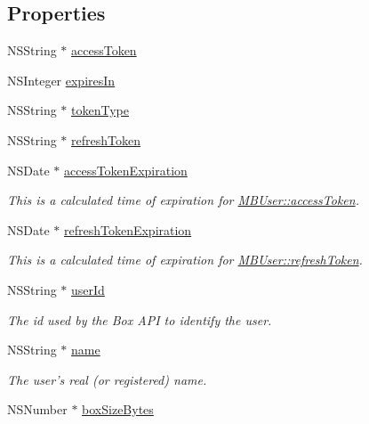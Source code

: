 \subsection*{Properties}
\begin{DoxyCompactItemize}
\item 
N\-S\-String $\ast$ \hyperlink{interface_m_b_user_aae7d6df5c0e6da13e80b3ddb82ae7081}{access\-Token}
\item 
N\-S\-Integer \hyperlink{interface_m_b_user_ae251d07feaa95423629811e829c40f0a}{expires\-In}
\item 
N\-S\-String $\ast$ \hyperlink{interface_m_b_user_aebb1b1ab373299d1bbcb8edacfc117c2}{token\-Type}
\item 
N\-S\-String $\ast$ \hyperlink{interface_m_b_user_a52a523200e9ed6203d66dc7250c725dd}{refresh\-Token}
\item 
N\-S\-Date $\ast$ \hyperlink{interface_m_b_user_a66df6e37883628503b521d292bbe692b}{access\-Token\-Expiration}
\begin{DoxyCompactList}\small\item\em This is a calculated time of expiration for \hyperlink{interface_m_b_user_aae7d6df5c0e6da13e80b3ddb82ae7081}{M\-B\-User\-::access\-Token}. \end{DoxyCompactList}\item 
N\-S\-Date $\ast$ \hyperlink{interface_m_b_user_a73ea1a88a0ebe4f2fe0e71809784ebfd}{refresh\-Token\-Expiration}
\begin{DoxyCompactList}\small\item\em This is a calculated time of expiration for \hyperlink{interface_m_b_user_a52a523200e9ed6203d66dc7250c725dd}{M\-B\-User\-::refresh\-Token}. \end{DoxyCompactList}\item 
N\-S\-String $\ast$ \hyperlink{interface_m_b_user_a25211835b4b5dff492e975e6231df626}{user\-Id}
\begin{DoxyCompactList}\small\item\em The id used by the Box A\-P\-I to identify the user. \end{DoxyCompactList}\item 
N\-S\-String $\ast$ \hyperlink{interface_m_b_user_a4b93d352d2fca75b34e1b5a50e03f587}{name}
\begin{DoxyCompactList}\small\item\em The user's real (or registered) name. \end{DoxyCompactList}\item 
N\-S\-Number $\ast$ \hyperlink{interface_m_b_user_a5f0c26ade8cb0b15f1067b38c019ce7a}{box\-Size\-Bytes}

\end{DoxyCompactItemize}
